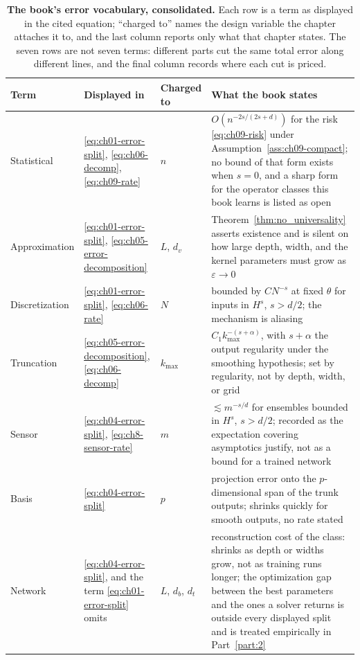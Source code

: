 \begin{table}[t]
\centering
\small
\caption{\textbf{The book's error vocabulary, consolidated.} Each row is a term as
displayed in the cited equation; ``charged to'' names the design variable the chapter
attaches it to, and the last column reports only what that chapter states. The seven
rows are not seven terms: different parts cut the same total error along different
lines, and the final column records where each cut is priced.}
\label{tab:appg-error}
\begin{tabularx}{\textwidth}{@{}l >{\raggedright\arraybackslash}X l >{\raggedright\arraybackslash}X@{}}
\toprule
\textbf{Term} & \textbf{Displayed in} & \textbf{Charged to} & \textbf{What the book states} \\
\midrule
Statistical & \eqref{eq:ch01-error-split}, \eqref{eq:ch06-decomp}, \eqref{eq:ch09-rate} & $n$ & $O(n^{-2s/(2s+d)})$ for the risk \eqref{eq:ch09-risk} under Assumption~\ref{ass:ch09-compact}; no bound of that form exists when $s = 0$, and a sharp form for the operator classes this book learns is listed as open \\
Approximation & \eqref{eq:ch01-error-split}, \eqref{eq:ch05-error-decomposition} & $L$, $d_{v}$ & Theorem~\ref{thm:no_universality} asserts existence and is silent on how large depth, width, and the kernel parameters must grow as $\varepsilon \to 0$ \\
Discretization & \eqref{eq:ch01-error-split}, \eqref{eq:ch06-rate} & $N$ & bounded by $C N^{-s}$ at fixed $\theta$ for inputs in $H^{s}$, $s > d/2$; the mechanism is aliasing \\
Truncation & \eqref{eq:ch05-error-decomposition}, \eqref{eq:ch06-decomp} & $k_{\max}$ & $C_{1} k_{\max}^{-(s+\alpha)}$, with $s+\alpha$ the output regularity under the smoothing hypothesis; set by regularity, not by depth, width, or grid \\
Sensor & \eqref{eq:ch04-error-split}, \eqref{eq:ch8-sensor-rate} & $m$ & $\lesssim m^{-s/d}$ for ensembles bounded in $H^{s}$, $s > d/2$; recorded as the expectation covering asymptotics justify, not as a bound for a trained network \\
Basis & \eqref{eq:ch04-error-split} & $p$ & projection error onto the $p$-dimensional span of the trunk outputs; shrinks quickly for smooth outputs, no rate stated \\
Network & \eqref{eq:ch04-error-split}, and the term \eqref{eq:ch01-error-split} omits & $L$, $d_b$, $d_t$ & reconstruction cost of the class: shrinks as depth or widths grow, not as training runs longer; the optimization gap between the best parameters and the ones a solver returns is outside every displayed split and is treated empirically in Part~\ref{part:2} \\
\bottomrule
\end{tabularx}
\end{table}

